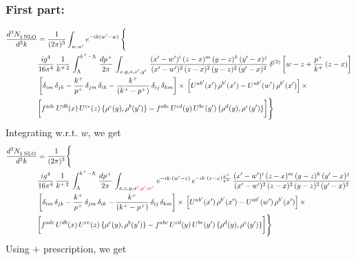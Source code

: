 \documentclass[9pt]{article}
\numberwithin{equation}{section}
\begin{document}
\subsubsection{First part:}
\begin{align}
    \frac{d^{3}N_{1\,\rm NLO}^{\rm}}{d^{3}k}  & = \frac{1}{(2\pi)^{3}}  \int_{w, w^\prime} e^{-ik(w^\prime-w)}\, \Bigg\{\notag \\ & \frac{ig^{4}}{16\pi^{4}}\, \frac{1}{k^{+\,2}}\,\int_{\Lambda}^{k^{+}-\Lambda}\, \frac{dp^{+}}{2\pi}\,\int_{x,y,z,x',y'}\,\frac{(x'-w')^{i}\,(z-x)^{m}\,(y-z)^{k}\,(y'-x)^{j}}{(x'-w')^{2}\,(z-x)^{2}\,(y-z)^{2}\,(y'-x)^{2}}\, \delta^{(2)}\left[w-z+\frac{p^{+}}{k^{+}}\,(z-x)\right]\notag \\ & \left[\delta_{im}\,\delta_{jk}-\frac{k^{+}}{p^{+}}\, \delta_{jm}\,\delta_{ik}-\frac{k^{+}}{(k^{+}-p^{+})}\, \delta_{ij}\,\delta_{km}\right]\times\, \left[U^{ab'}(x')\,\rho^{b'}(x')-U^{ab'}(w')\,\rho^{b'}(x')\right]\times\notag \\ & \bigg[f^{adc}\,U^{db}(x)\,U^{ce}(z)\, \{\rho^{e}(y),\rho^{b}(y')\}-f^{abc}\,U^{cd}(y)\,U^{be}(y')\, \{\rho^{d}(y),\rho^{e}(y')\}\bigg]\Bigg\}
\end{align}
Integrating w.r.t. $w$, we get
\begin{align}
     \frac{d^{3}N_{1\,\rm NLO}^{\rm}}{d^{3}k}  & = \frac{1}{(2\pi)^{3}} \Bigg\{\notag \\ &  \frac{ig^{4}}{16\pi^{4}}\, \frac{1}{k^{+\,2}}\,\int_{\Lambda}^{k^{+}-\Lambda}\, \frac{dp^{+}}{2\pi}\,\int_{x,z,y,x',{\color{red}y',w'}}\,e^{-ik\cdot (w^\prime-z)}\,e^{-ik\cdot (z-x)\frac{p^{+}}{k^{+}}}\,\frac{(x'-w')^{i}\,(z-x)^{m}\,(y-z)^{k}\,(y'-x)^{j}}{(x'-w')^{2}\,(z-x)^{2}\,(y-z)^{2}\,(y'-x)^{2}}\,\notag \\ & \left[\delta_{im}\,\delta_{jk}-\frac{k^{+}}{p^{+}}\, \delta_{jm}\,\delta_{ik}-\frac{k^{+}}{(k^{+}-p^{+})}\, \delta_{ij}\,\delta_{km}\right]\times\, \left[U^{ab'}(x')\,\rho^{b'}(x')-U^{ab'}(w')\,\rho^{b'}(x')\right]\times\notag \\ & \bigg[f^{adc}\,U^{db}(x)\,U^{ce}(z)\, \{\rho^{e}(y),\rho^{b}(y')\}-f^{abc}\,U^{cd}(y)\,U^{be}(y')\, \{\rho^{d}(y),\rho^{e}(y')\}\bigg]\Bigg\}
\end{align}
Using $+$ prescription, we get
\end{document}
